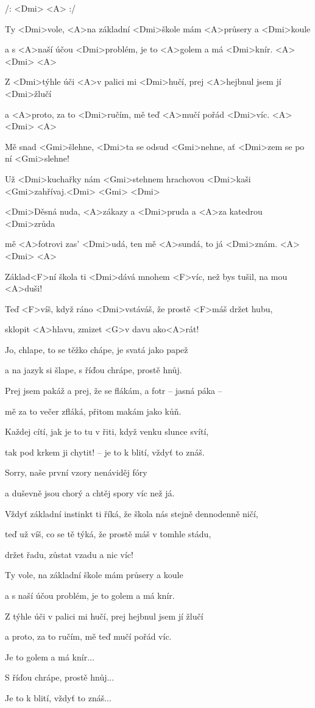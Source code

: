 

/: <Dmi> <A> :/ 

\zs
Ty <Dmi>vole, <A>na základní <Dmi>škole
mám <A>průsery a <Dmi>koule 

a s <A>naší účou <Dmi>problém,
je to <A>golem a má <Dmi>knír. <A> <Dmi> <A>

Z <Dmi>týhle úči <A>v palici mi <Dmi>hučí,
prej <A>hejbnul jsem jí <Dmi>žlučí 

a <A>proto, za to <Dmi>ručím,
mě teď <A>mučí pořád <Dmi>víc. <A> <Dmi> <A>
\ks

\zs

Mě snad <Gmi>šlehne, <Dmi>ta se odsud <Gmi>nehne,
ať <Dmi>zem se po ní <Gmi>slehne! 

Už <Dmi>kuchařky nám <Gmi>stehnem
hrachovou <Dmi>kaši <Gmi>zahřívaj.<Dmi> <Gmi> <Dmi>

<Dmi>Děsná nuda, <A>zákazy a <Dmi>pruda
a <A>za katedrou <Dmi>zrůda

mě <A>fotrovi zas' <Dmi>udá,
ten mě <A>sundá, to já <Dmi>znám. <A> <Dmi> <A> 

\ks

\zr
Základ<F>ní škola ti <Dmi>dává
mnohem <F>víc, než bys tušil, na mou <A>duši!

Teď <F>víš, když ráno <Dmi>vstáváš,
že prostě <F>máš držet hubu, 

sklopit <A>hlavu, zmizet <G>v davu ako<A>rát!
\kr

\zs
Jo, chlape, to se těžko chápe, je svatá jako papež 

a na jazyk si šlape, s říďou chrápe, prostě hnůj.

Prej jsem pakáž a prej, že se flákám, a fotr -- jasná páka --

mě za to večer zfláká, přitom makám jako kůň.

\ks

\zs

Každej cítí, jak je to tu v řiti, když venku slunce svítí,

tak pod krkem ji chytit! -- je to k blití, vždyť to znáš.

Sorry, naše první vzory nenáviděj fóry 

a duševně jsou chorý a chtěj spory víc než já.
\ks

\zr
Vždyť základní instinkt ti říká, že škola nás stejně dennodenně ničí,

teď už víš, co se tě týká, že prostě máš v tomhle stádu,

držet řadu, zůstat vzadu a nic víc!
\kr 

\zs
Ty vole, na základní škole mám průsery a koule 

a s naší účou problém, je to golem a má knír.
\ks

\zs
Z týhle úči v palici mi hučí, prej hejbnul jsem jí žlučí 

a proto, za to ručím, mě teď mučí pořád víc.

Je to golem a má knír...
 
S říďou chrápe, prostě hnůj...
 
Je to k blití, vždyť to znáš...
\ks

\kp
